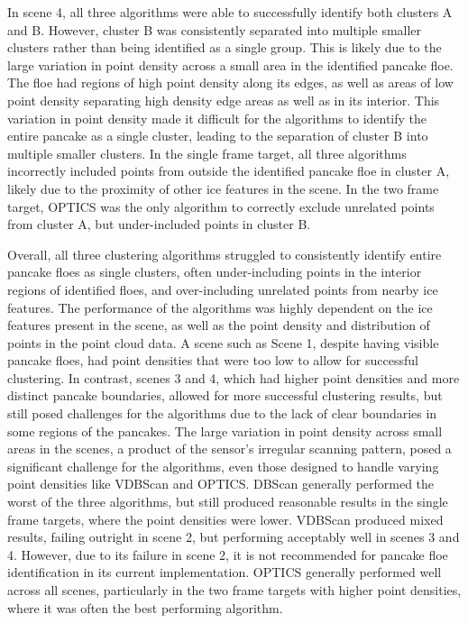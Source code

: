 In scene 4, all three algorithms were able to successfully identify both clusters A and B. However, cluster B was consistently separated into multiple smaller clusters rather than being identified as a single group. This is likely due to the large variation in point density across a small area in the identified pancake floe. The floe had regions of high point density along its edges, as well as areas of low point density separating high density edge areas as well as in its interior. This variation in point density made it difficult for the algorithms to identify the entire pancake as a single cluster, leading to the separation of cluster B into multiple smaller clusters. In the single frame target, all three algorithms incorrectly included points from outside the identified pancake floe in cluster A, likely due to the proximity of other ice features in the scene. In the two frame target, \ac{OPTICS} was the only algorithm to correctly exclude unrelated points from cluster A, but under-included points in cluster B.

Overall, all three clustering algorithms struggled to consistently identify entire pancake floes as single clusters, often under-including points in the interior regions of identified floes, and over-including unrelated points from nearby ice features. The performance of the algorithms was highly dependent on the ice features present in the scene, as well as the point density and distribution of points in the point cloud data. A scene such as Scene 1, despite having visible pancake floes, had point densities that were too low to allow for successful clustering. In contrast, scenes 3 and 4, which had higher point densities and more distinct pancake boundaries, allowed for more successful clustering results, but still posed challenges for the algorithms due to the lack of clear boundaries in some regions of the pancakes. The large variation in point density across small areas in the scenes, a product of the sensor's irregular scanning pattern, posed a significant challenge for the algorithms, even those designed to handle varying point densities like \ac{VDBScan} and \ac{OPTICS}. \ac{DBScan} generally performed the worst of the three algorithms, but still produced reasonable results in the single frame targets, where the point densities were lower. \ac{VDBScan} produced mixed results, failing outright in scene 2, but performing acceptably well in scenes 3 and 4. However, due to its failure in scene 2, it is not recommended for pancake floe identification in its current implementation. \ac{OPTICS} generally performed well across all scenes, particularly in the two frame targets with higher point densities, where it was often the best performing algorithm.

